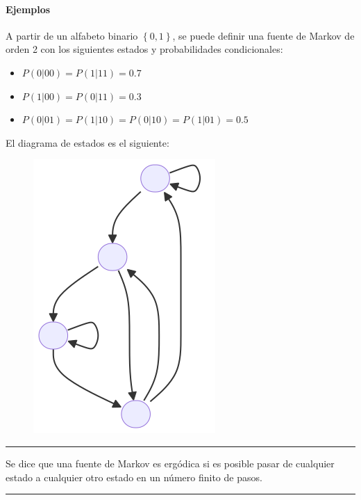 \paragraph{Ejemplos}\label{ejemplos}

A partir de un alfabeto binario \(\left\{0,1\right\}\), se puede definir
una fuente de Markov de orden 2 con los siguientes estados y
probabilidades condicionales:

\begin{itemize}
\tightlist
\item
  \(P(0|00)=P(1|11)=0.7\)
\item
  \(P(1|00)=P(0|11)=0.3\)
\item
  \(P(0|01)=P(1|10)=P(0|10)=P(1|01)=0.5\)
\end{itemize}

\pagebreak

El diagrama de estados es el siguiente:

\begin{figure}[htbp!]
\centering
\includegraphics[width=0.5\linewidth]{./img/fuente-de-markov-diagrama-de-estados.png}
\end{figure}

\begin{center}\rule{0.5\linewidth}{0.5pt}\end{center}

Se dice que una fuente de Markov es ergódica si es posible pasar de
cualquier estado a cualquier otro estado en un número finito de pasos.

\begin{center}\rule{0.5\linewidth}{0.5pt}\end{center}


